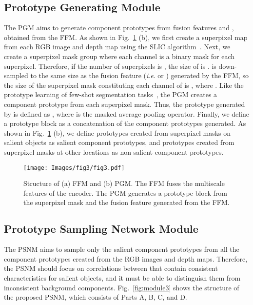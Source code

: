 \documentclass[runningheads]{llncs}
\begin{document}
	\subsection{Prototype Generating Module}
	The PGM aims to generate component prototypes from fusion features  and , obtained from the FFM. As shown in Fig.~\ref{fig:module1&2} (b), we first create a superpixel map  from each RGB image  and depth map  using the SLIC algorithm~\cite{achanta2012slic}. Next, we create a superpixel mask group  where each channel is a binary mask for each superpixel. Therefore, if the number of superpixels is , the size of  is .  is down-sampled to the same size as the fusion feature  (\textit{i}.\textit{e}.  or ) generated by the FFM, so the size of the superpixel mask  constituting each channel of  is , where . Like the prototype learning of few-shot segmentation tasks~\cite{wang2019panet,li2021adaptive,liu2020part}, the PGM creates a component prototype from each superpixel mask. Thus, the prototype  generated by  is defined as , where  is the masked average pooling operator. Finally, we define a prototype block  as a concatenation of the component prototypes generated. As shown in Fig.~\ref{fig:module1&2} (b), we define prototypes created from superpixel masks on salient objects as salient component prototypes, and prototypes created from superpixel masks at other locations as non-salient component prototypes.
	
	\begin{figure}[t]
		\setlength{\belowcaptionskip}{-24pt}
		\begin{center}
			\texttt{[image: Images/fig3/fig3.pdf]}
			\caption{Structure of (a) FFM and (b) PGM. The FFM fuses the multiscale features of the encoder. The PGM generates a prototype block from the superpixel mask  and the fusion feature  generated from the FFM.}
			\label{fig:module1&2}
		\end{center}
	\end{figure}
	
	\subsection{Prototype Sampling Network Module}
	\label{PSNM}
	The PSNM aims to sample only the salient component prototypes from all the component prototypes  created from the RGB images and depth maps. Therefore, the PSNM should focus on correlations between  that contain consistent characteristics for salient objects, and it must be able to distinguish them from inconsistent background components. Fig.~\ref{fig:module3} shows the structure of the proposed PSNM, which consists of Parts A, B, C, and D.
	
\end{document}
